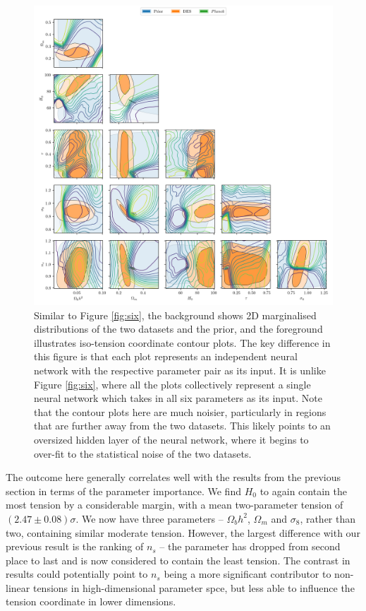 \documentclass[%
 reprint,
 amsmath,amssymb,
 aps,
]{revtex4-2}
\begin{document}
\begin{figure}
    \includegraphics[width=\textwidth]{../plots/pairs.png}
    \centering
    \caption{Similar to Figure \ref{fig:six}, the background shows 2D marginalised distributions of the two datasets and the prior, and the foreground illustrates iso-tension coordinate contour plots. The key difference in this figure is that each plot represents an independent neural network with the respective parameter pair as its input. It is unlike Figure \ref{fig:six}, where all the plots collectively represent a single neural network which takes in all six parameters as its input. Note that the contour plots here are much noisier, particularly in regions that are further away from the two datasets. This likely points to an oversized hidden layer of the neural network, where it begins to over-fit to the statistical noise of the two datasets.}
    \label{fig:pairs}
\end{figure}

The outcome here generally correlates well with the results from the previous section in terms of the parameter importance. We find $H_0$ to again contain the most tension by a considerable margin, with a mean two-parameter tension of $(2.47 \pm 0.08)\sigma$. We now have three parameters -- $\Omega_b h^2$, $\Omega_m$ and $\sigma_8$, rather than two, containing similar moderate tension. However, the largest difference with our previous result is the ranking of $n_s$ -- the parameter has dropped from second place to last and is now considered to contain the least tension. The contrast in results could potentially point to $n_s$ being a more significant contributor to non-linear tensions in high-dimensional parameter spce, but less able to influence the tension coordinate in lower dimensions.
\end{document}
